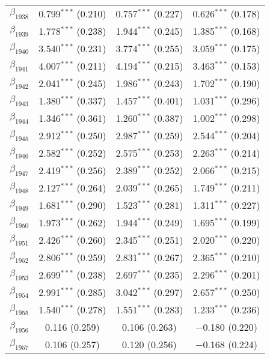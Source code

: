 \begin{table}[!h]
\begin{tabular}{@{\extracolsep{5pt}}lccc}
  $\beta_{1938}$ & 0.799$^{***}$ (0.210) & 0.757$^{***}$ (0.227) & 0.626$^{***}$ (0.178) \\ 
  $\beta_{1939}$ & 1.778$^{***}$ (0.238) & 1.944$^{***}$ (0.245) & 1.385$^{***}$ (0.168) \\ 
  $\beta_{1940}$ & 3.540$^{***}$ (0.231) & 3.774$^{***}$ (0.255) & 3.059$^{***}$ (0.175) \\ 
  $\beta_{1941}$ & 4.007$^{***}$ (0.211) & 4.194$^{***}$ (0.215) & 3.463$^{***}$ (0.153) \\ 
  $\beta_{1942}$ & 2.041$^{***}$ (0.245) & 1.986$^{***}$ (0.243) & 1.702$^{***}$ (0.190) \\ 
  $\beta_{1943}$ & 1.380$^{***}$ (0.337) & 1.457$^{***}$ (0.401) & 1.031$^{***}$ (0.296) \\ 
  $\beta_{1944}$ & 1.346$^{***}$ (0.361) & 1.260$^{***}$ (0.387) & 1.002$^{***}$ (0.298) \\ 
  $\beta_{1945}$ & 2.912$^{***}$ (0.250) & 2.987$^{***}$ (0.259) & 2.544$^{***}$ (0.204) \\ 
  $\beta_{1946}$ & 2.582$^{***}$ (0.252) & 2.575$^{***}$ (0.253) & 2.263$^{***}$ (0.214) \\ 
  $\beta_{1947}$ & 2.419$^{***}$ (0.256) & 2.389$^{***}$ (0.252) & 2.066$^{***}$ (0.215) \\ 
  $\beta_{1948}$ & 2.127$^{***}$ (0.264) & 2.039$^{***}$ (0.265) & 1.749$^{***}$ (0.211) \\ 
  $\beta_{1949}$ & 1.681$^{***}$ (0.290) & 1.523$^{***}$ (0.281) & 1.311$^{***}$ (0.227) \\ 
  $\beta_{1950}$ & 1.973$^{***}$ (0.262) & 1.944$^{***}$ (0.249) & 1.695$^{***}$ (0.199) \\ 
  $\beta_{1951}$ & 2.426$^{***}$ (0.260) & 2.345$^{***}$ (0.251) & 2.020$^{***}$ (0.220) \\ 
  $\beta_{1952}$ & 2.806$^{***}$ (0.259) & 2.831$^{***}$ (0.267) & 2.365$^{***}$ (0.210) \\ 
  $\beta_{1953}$ & 2.699$^{***}$ (0.238) & 2.697$^{***}$ (0.235) & 2.296$^{***}$ (0.201) \\ 
  $\beta_{1954}$ & 2.991$^{***}$ (0.285) & 3.042$^{***}$ (0.297) & 2.657$^{***}$ (0.250) \\ 
  $\beta_{1955}$ & 1.540$^{***}$ (0.278) & 1.551$^{***}$ (0.283) & 1.233$^{***}$ (0.236) \\ 
  $\beta_{1956}$ & 0.116 (0.259) & 0.106 (0.263) & $-$0.180 (0.220) \\ 
  $\beta_{1957}$ & 0.106 (0.257) & 0.120 (0.256) & $-$0.168 (0.224) \\ 

\end{tabular}
\end{table}
